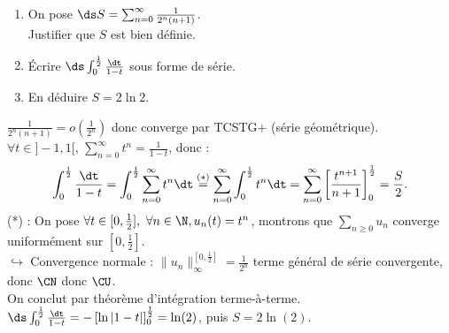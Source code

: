 \documentclass[11pt]{article}
\begin{document}
\begin{ex}{}{}
    \begin{enumerate}
        \item On pose $\ds S=\sum_{n=0}^\infty\frac{1}{2^n(n+1)}$.\\
        Justifier que $S$ est bien définie.
        \item Écrire $\ds\int_0^\frac{1}{2}\frac{\dt}{1-t}$ sous forme de série.
        \item En déduire $S=2\ln 2$.
    \end{enumerate}
    \tcblower
     $\frac{1}{2^n(n+1)}=o\left(\frac{1}{2^n}\right)$ donc converge par TCSTG+ (série géométrique).\\
     $\forall t \in ]-1,1[$, $\sum_{n=0}^\infty t^n = \frac{1}{1-t}$, donc : 
    \begin{equation*}
        \int_0^\frac{1}{2}\frac{\dt}{1-t}=\int_0^\frac{1}{2}\sum_{n=0}^\infty t^n\dt\overset{(*)}{=}\sum_{n=0}^\infty \int_0^\frac{1}{2}t^n\dt = \sum_{n=0}^\infty\left[ \frac{t^{n+1}}{n+1} \right]_0^{\frac{1}{2}}=\frac{S}{2}.
    \end{equation*}
    (*) : On pose $\forall t \in [0,\frac{1}{2}], ~ \forall n \in \N, u_n(t)=t^n$, montrons que $\sum_{n\geq0} u_n$ converge uniformément sur $[0,\frac{1}{2}]$.\\
    $\hookrightarrow$ Convergence normale : $\|u_n\|_\infty^{[0,\frac{1}{2}]}=\frac{1}{2^n}$ terme général de série convergente, donc $\CN$ donc $\CU$.\\
    On conclut par théorème d'intégration terme-à-terme.\\
     $\ds\int_0^\frac{1}{2}\frac{\dt}{1-t}=-\left[ \ln|1-t| \right]_0^\frac{1}{2}=\ln(2)$, puis $S=2\ln(2)$.
\end{ex}
\end{document}
